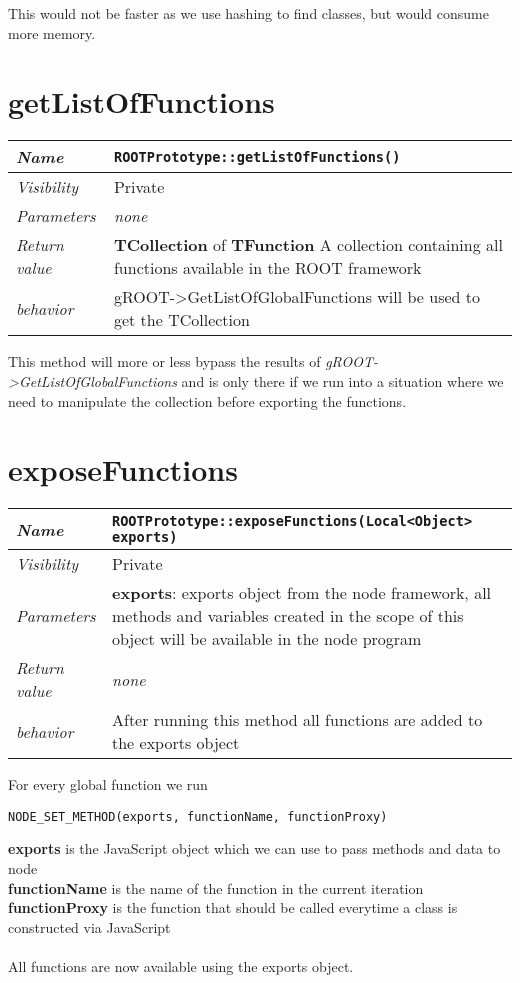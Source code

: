 This would not be faster as we use hashing to find classes, but would consume more memory.
\newpage
\section{getListOfFunctions}
\begin{longtable}{p{3cm} @{\hskip 1cm} p{12cm}}
  \hline
  \textit{Name} & \texttt{ROOTPrototype::getListOfFunctions()} \\
  \hline
  \textit{Visibility} & Private \\
  \hline
  \textit{Parameters} & \textit{none} \\
  \hline
  \textit{Return value} & \textbf{TCollection} of \textbf{TFunction} A collection containing all functions available in the ROOT framework \\
  \hline
  \textit{behavior} & gROOT->GetListOfGlobalFunctions will be used to get the TCollection \\
  \hline
\end{longtable}
This method will more or less bypass the results of \textit{gROOT->GetListOfGlobalFunctions} and is only there if we run into a situation where we need to manipulate the collection before exporting the functions.
\newpage
\section{exposeFunctions}
\begin{longtable}{p{3cm} @{\hskip 1cm} p{12cm}}
  \hline
  \textit{Name} & \texttt{ROOTPrototype::exposeFunctions(Local<Object> exports)} \\
  \hline
  \textit{Visibility} & Private \\
  \hline
  \textit{Parameters} & \textbf{exports}: exports object from the node framework, all methods and variables created in the scope of this object will be available in the node program \\
  \hline
  \textit{Return value} & \textit{none} \\
  \hline
  \textit{behavior} & After running this method all functions are added to the exports object \\
  \hline
\end{longtable}

For every global function we run
\begin{verbatim}
NODE_SET_METHOD(exports, functionName, functionProxy)
\end{verbatim}

\textbf{exports} is the JavaScript object which we can use to pass methods and data to node \\
\textbf{functionName} is the name of the function in the current iteration\\
\textbf{functionProxy} is the function that should be called everytime a class is constructed via JavaScript\\
\\
All functions are now available using the exports object.
\newpage
